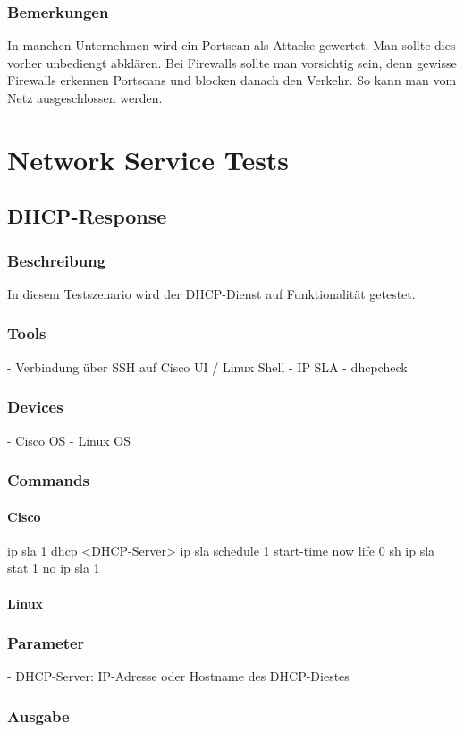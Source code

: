 \documentclass[a4,12pt]{scrartcl}
\begin{document}
\subsubsection{Bemerkungen}
In manchen Unternehmen wird ein Portscan als Attacke gewertet. Man sollte dies vorher unbediengt abklären.
Bei Firewalls sollte man vorsichtig sein, denn gewisse Firewalls erkennen Portscans und blocken danach den Verkehr. So kann man vom Netz ausgeschlossen werden.



\newpage
\section{Network Service Tests}
\subsection{DHCP-Response}
\subsubsection{Beschreibung}
In diesem Testszenario wird der DHCP-Dienst auf Funktionalität getestet.
\subsubsection{Tools}
- Verbindung über SSH auf Cisco UI / Linux Shell
- IP SLA
- dhcpcheck
\subsubsection{Devices}
- Cisco OS
- Linux OS
\subsubsection{Commands}
\paragraph{Cisco}
ip sla 1
dhcp <DHCP-Server>
ip sla schedule 1 start-time now life 0
sh ip sla stat 1
no ip sla 1
			
\paragraph{Linux}
\subsubsection{Parameter}
- DHCP-Server: IP-Adresse oder Hostname des DHCP-Diestes
\subsubsection{Ausgabe}
\end{document}
